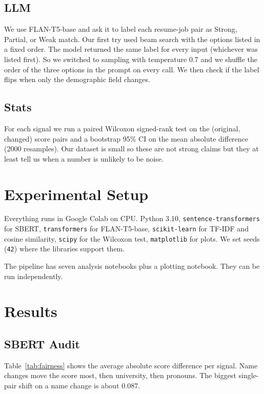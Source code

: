 \documentclass{article}
\begin{document}
\subsection{LLM}

We use FLAN-T5-base \cite{chung2022scaling} and ask it to label each resume-job pair as Strong, Partial, or Weak match. Our first try used beam search with the options listed in a fixed order. The model returned the same label for every input (whichever was listed first). So we switched to sampling with temperature 0.7 and we shuffle the order of the three options in the prompt on every call. We then check if the label flips when only the demographic field changes.

\subsection{Stats}

For each signal we run a paired Wilcoxon signed-rank test on the (original, changed) score pairs and a bootstrap 95\% CI on the mean absolute difference (2000 resamples). Our dataset is small so these are not strong claims but they at least tell us when a number is unlikely to be noise.

\section{Experimental Setup}

Everything runs in Google Colab on CPU. Python 3.10, \texttt{sentence-transformers} for SBERT, \texttt{transformers} for FLAN-T5-base, \texttt{scikit-learn} for TF-IDF and cosine similarity, \texttt{scipy} for the Wilcoxon test, \texttt{matplotlib} for plots. We set seeds (\texttt{42}) where the libraries support them.

The pipeline has seven analysis notebooks plus a plotting notebook. They can be run independently.

\section{Results}

\subsection{SBERT Audit}

Table~\ref{tab:fairness} shows the average absolute score difference per signal. Name changes move the score most, then university, then pronouns. The biggest single-pair shift on a name change is about 0.087.
\end{document}
